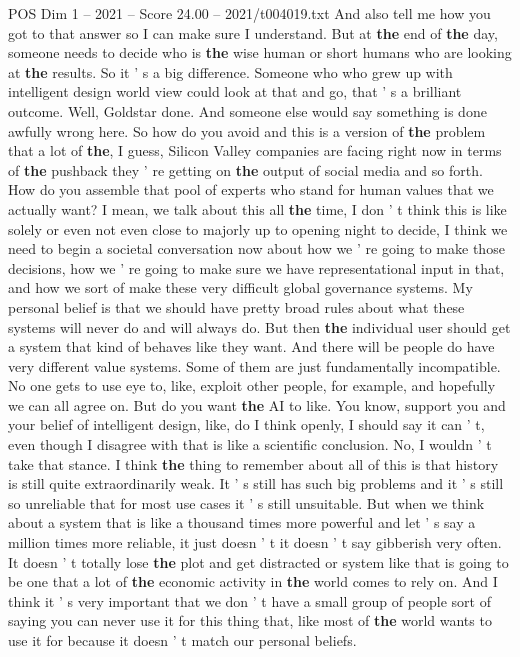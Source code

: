 \begin{textsample}{POS Dim 1 – 2021 – Score 24.00 – 2021/t004019.txt}
And also tell me how you got to that answer so I can make sure I understand.
But at \textbf{the} end of \textbf{the} day, someone needs to decide who is \textbf{the} wise human or short humans who are looking at \textbf{the} results.
So it ' s a big difference.
Someone who who grew up with intelligent design world view could look at that and go, that ' s a brilliant outcome.
Well, Goldstar done.
And someone else would say something is done awfully wrong here.
So how do you avoid and this is a version of \textbf{the} problem that a lot of \textbf{the}, I guess, Silicon Valley companies are facing right now in terms of \textbf{the} pushback they ' re getting on \textbf{the} output of social media and so forth.
How do you assemble that pool of experts who stand for human values that we actually want?
I mean, we talk about this all \textbf{the} time, I don ' t think this is like solely or even not even close to majorly up to opening night to decide, I think we need to begin a societal conversation now about how we ' re going to make those decisions, how we ' re going to make sure we have representational input in that, and how we sort of make these very difficult global governance systems.
My personal belief is that we should have pretty broad rules about what these systems will never do and will always do.
But then \textbf{the} individual user should get a system that kind of behaves like they want.
And there will be people do have very different value systems.
Some of them are just fundamentally incompatible.
No one gets to use eye to, like, exploit other people, for example, and hopefully we can all agree on.
But do you want \textbf{the} AI to like.
You know, support you and your belief of intelligent design, like, do I think openly, I should say it can ' t, even though I disagree with that is like a scientific conclusion.
No, I wouldn ' t take that stance.
I think \textbf{the} thing to remember about all of this is that history is still quite extraordinarily weak.
It ' s still has such big problems and it ' s still so unreliable that for most use cases it ' s still unsuitable.
But when we think about a system that is like a thousand times more powerful and let ' s say a million times more reliable, it just doesn ' t it doesn ' t say gibberish very often.
It doesn ' t totally lose \textbf{the} plot and get distracted or system like that is going to be one that a lot of \textbf{the} economic activity in \textbf{the} world comes to rely on.
And I think it ' s very important that we don ' t have a small group of people sort of saying you can never use it for this thing that, like most of \textbf{the} world wants to use it for because it doesn ' t match our personal beliefs.

\end{textsample}
